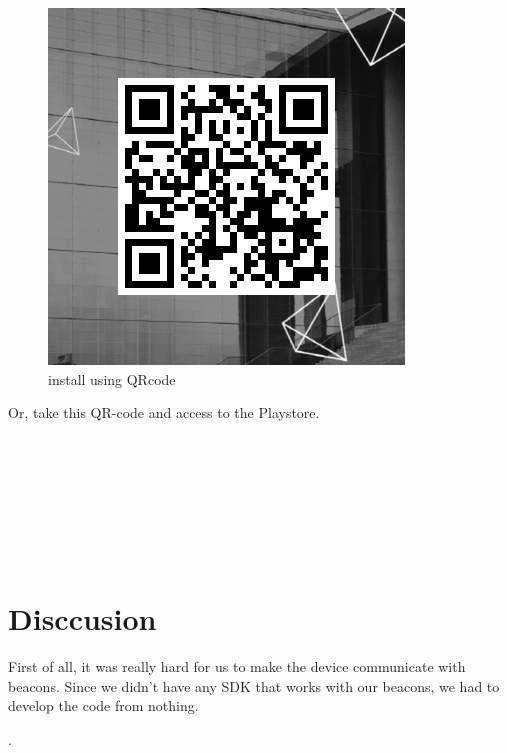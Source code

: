 \documentclass[conference]{IEEEtran}
\begin{document}
\begin{figure}[htbp]
\begin{center}
    \includegraphics[scale=0.4]{img_qrcode}
    \caption{install using QRcode} 
\end{center}
\end{figure}

Or, take this QR-code and access to the Playstore.\\\\\\\\\\\\\\\\

\section{Disccusion}
\quad First of all, it was really hard for us to make the device communicate with beacons.
Since we didn't have any SDK that works with our beacons, we had to develop the code from nothing. 


.
%
%
\end{document}
